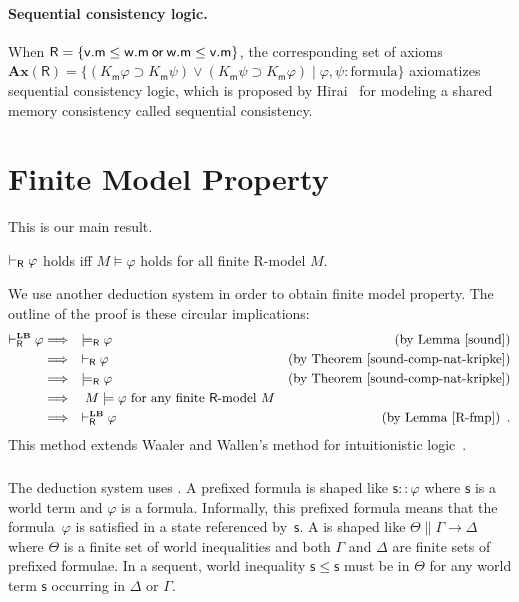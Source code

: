     \paragraph{Sequential consistency logic.}
    When $\mathsf R=\{\mathsf v.\mathsf m\le\mathsf w.\mathsf m\mathbin{\mathsf{or}} \mathsf
    w.\mathsf m\le \mathsf v.\mathsf m\}$,
    the corresponding set of axioms
    $\mathbf{Ax}(\mathsf R) = \{(K_{\mathsf m}\varphi\supset K_{\mathsf
    m}\psi)\vee(K_{\mathsf m}\psi\supset K_{\mathsf m}\varphi)\mid \varphi,
    \psi\colon\mbox{formula}\}$
    axiomatizes sequential consistency logic,
    which is proposed by Hirai~\cite{hirailpar} for modeling a shared memory consistency called sequential consistency.


  \section{Finite Model Property}
  \label{fmp-proof}

  This is our main result.
  \begin{theorem}
   \label{thm:fmp}
   $\vdash_{\mathsf R}\varphi$ holds iff $M\models \varphi$ holds
   for all finite {\sf R}-model $M$.
  \end{theorem}

  We use another deduction system\,\LB\,in order to obtain finite model
  property.
  The outline of the proof is these circular implications:
  \begin{align*}
   \vdashRLB\varphi &\Longrightarrow \quad \models_{\mathsf R}\varphi\quad
   &(\mbox{by Lemma~\ref{sound}})\\
   &\Longrightarrow \quad \vdash_{\mathsf R}\varphi &(\mbox{by
   Theorem~\ref{sound-comp-nat-kripke}}) \\
   &\Longrightarrow\quad \modelsR\varphi &\mbox{(by Theorem~\ref{sound-comp-nat-kripke})}\\
   &\Longrightarrow\quad M\models\varphi \mbox{ for any finite $\mathsf
   R$-model }M\\
   &\Longrightarrow\quad \vdashRLB\varphi & (\mbox{by
   Lemma~\ref{R-fmp}})\enspace .
  \end{align*}
  This method extends Waaler
  and Wallen's method for intuitionistic logic~\cite{waaler1999tableaux}.

   \subsubsection{\LB}

   The deduction system\,\LB\,uses .  A
   prefixed formula is shaped like $\mathsf s::\varphi$ where $\mathsf s $
   is a world term and $\varphi$ is a formula.
   Informally, this prefixed formula means that the formula~$\varphi$ is
   satisfied in a state referenced by~$\mathsf s$.
   A  is shaped like
   $\Theta\parallel \Gamma\longrightarrow \Delta$ where
   $\Theta$ is a finite set of world inequalities and both
   $\Gamma$ and $\Delta$ are finite sets of prefixed formulae.
   In a sequent, world inequality
   $\mathsf s\le \mathsf s$ must be in $\Theta$
   for any world term $\mathsf s$ occurring in $\Delta$ or $\Gamma$.

